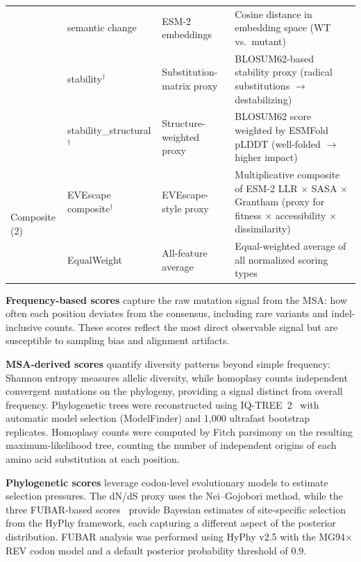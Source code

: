 \begin{table}[htbp]
{\begin{tabular}{llll}
 & semantic change & ESM-2 embeddings & Cosine distance in embedding space (WT vs.\ mutant) \\
 & stability$^{\dagger}$ & Substitution-matrix proxy & BLOSUM62-based stability proxy (radical substitutions $\to$ destabilizing) \\
 & stability\_structural$^{\dagger}$ & Structure-weighted proxy & BLOSUM62 score weighted by ESMFold pLDDT (well-folded $\to$ higher impact) \\
\midrule
\multirow{2}{*}{Composite (2)} & EVEscape composite$^{\dagger}$ & EVEscape-style proxy & Multiplicative composite of ESM-2 LLR $\times$ SASA $\times$ Grantham (proxy for fitness $\times$ accessibility $\times$ dissimilarity) \\
 & EqualWeight & All-feature average & Equal-weighted average of all normalized scoring types \\
\bottomrule
\end{tabular}
}
\end{table}

\textbf{Frequency-based scores} capture the raw mutation signal from the MSA: how often each position deviates from the consensus, including rare variants and indel-inclusive counts.
These scores reflect the most direct observable signal but are susceptible to sampling bias and alignment artifacts.

\textbf{MSA-derived scores} quantify diversity patterns beyond simple frequency: Shannon entropy measures allelic diversity, while homoplasy counts independent convergent mutations on the phylogeny, providing a signal distinct from overall frequency.
Phylogenetic trees were reconstructed using IQ-TREE~2~\cite{minh2020iqtree} with automatic model selection (ModelFinder) and 1{,}000 ultrafast bootstrap replicates. Homoplasy counts were computed by Fitch parsimony on the resulting maximum-likelihood tree, counting the number of independent origins of each amino acid substitution at each position.

\textbf{Phylogenetic scores} leverage codon-level evolutionary models to estimate selection pressures.
The dN/dS proxy uses the Nei--Gojobori method, while the three FUBAR-based scores~\cite{murrell2013fubar} provide Bayesian estimates of site-specific selection from the HyPhy framework, each capturing a different aspect of the posterior distribution.
FUBAR analysis was performed using HyPhy v2.5 with the MG94$\times$REV codon model and a default posterior probability threshold of 0.9.

